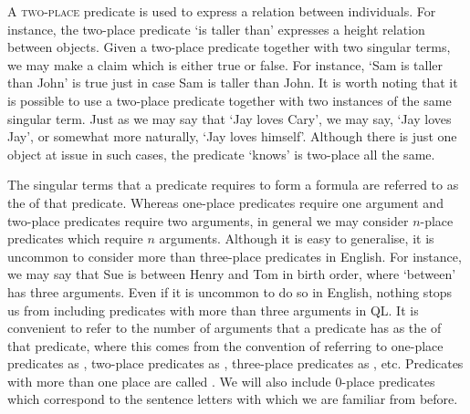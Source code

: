 A \textsc{two-place} predicate is used to express a relation between individuals.
For instance, the two-place predicate `is taller than' expresses a height relation between objects.
Given a two-place predicate together with two singular terms, we may make a claim which is either true or false.
For instance, `Sam is taller than John' is true just in case Sam is taller than John.
It is worth noting that it is possible to use a two-place predicate together with two instances of the same singular term.
Just as we may say that `Jay loves Cary', we may say, `Jay loves Jay', or somewhat more naturally, `Jay loves himself'.
Although there is just one object at issue in such cases, the predicate `knows' is two-place all the same. 

The singular terms that a predicate requires to form a formula are referred to as the  of that predicate.
Whereas one-place predicates require one argument and two-place predicates require two arguments, in general we may consider $n$-place predicates which require $n$ arguments. 
Although it is easy to generalise, it is uncommon to consider more than three-place predicates in English.
For instance, we may say that Sue is between Henry and Tom in birth order, where `between' has three arguments.
Even if it is uncommon to do so in English, nothing stops us from including predicates with more than three arguments in QL.
It is convenient to refer to the number of arguments that a predicate has as the  of that predicate, where this comes from the convention of referring to one-place predicates as , two-place predicates as , three-place predicates as , etc.
Predicates with more than one place are called .
We will also include $0$-place predicates which correspond to the sentence letters with which we are familiar from before.


